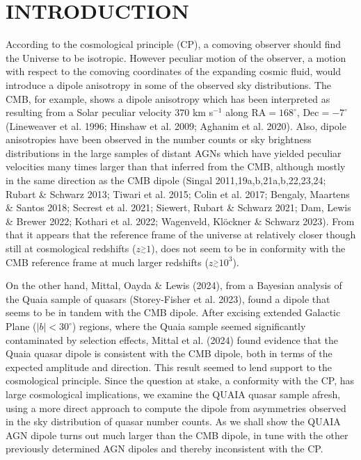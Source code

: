 \documentclass[fleqn,usenatbib]{mnras}
\begin{document}
\section{INTRODUCTION}
According to the cosmological principle (CP), a comoving observer should find the Universe to be isotropic. However peculiar motion of the observer, a motion with respect to the comoving coordinates of the expanding cosmic fluid, would introduce a dipole anisotropy in some of the observed sky distributions. The CMB, for example, shows a dipole anisotropy which has been interpreted as resulting from a Solar peculiar velocity $370$ km s$^{-1}$ along RA$=168^{\circ}$, Dec$=-7^{\circ}$  (Lineweaver et al. 1996; Hinshaw et al. 2009; Aghanim et al. 2020). 
Also, dipole anisotropies have been observed in the number counts or sky brightness distributions in the large samples of distant AGNs which have yielded peculiar velocities many times larger than that inferred from the CMB, although mostly in the same direction as the CMB dipole (Singal 2011,19a,b,21a,b,22,23,24; Rubart \& Schwarz 2013; Tiwari et al. 2015; Colin et al. 2017; Bengaly, Maartens \& Santos 2018; Secrest et al. 2021; Siewert, Rubart \& Schwarz 2021; Dam, Lewis \& Brewer 2022; Kothari et al. 2022; Wagenveld, Kl\"ockner \& Schwarz 2023).
From that it appears that the reference frame of the universe at relatively closer though still at cosmological redshifts ($z\stackrel{>}{_{\sim}} 1$), does not seem to be in conformity with the CMB reference frame at much larger redshifts ($z\stackrel{>}{_{\sim}} 10^3$). 

On the other hand, Mittal, Oayda \& Lewis (2024), from a Bayesian analysis of the Quaia sample of quasars (Storey-Fisher et al. 2023), found a dipole that seems to be in tandem with the CMB dipole. After excising extended Galactic Plane ($|b|<30^\circ$) regions, where the Quaia sample seemed significantly  contaminated by selection effects, Mittal et al. (2024) found evidence that the Quaia quasar dipole is consistent with the CMB dipole, both in terms of the expected amplitude and direction. This result seemed  to lend support to the cosmological principle. 
Since the question at stake, a conformity with the CP, has large cosmological implications, we examine the QUAIA quasar sample afresh, using a more direct approach to compute the dipole from asymmetries observed in the sky distribution of quasar number counts. As we shall show the QUAIA AGN dipole turns out  much larger than the CMB dipole, in tune with the other previously determined  AGN dipoles and thereby  inconsistent with the CP. 
\end{document}
